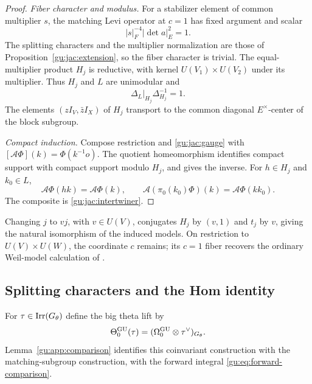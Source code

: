 \begin{proof}
\emph{Fiber character and modulus.}
For a stabilizer element of common multiplier $s$, the matching Levi
operator at $c=1$ has fixed argument and scalar
\begin{equation}\label{gu:jac:trivial-fiber}
 |s|_F^{-4}|\det a|_E^2=1.
\end{equation}
The splitting characters and the multiplier normalization are those of
Proposition~\ref{gu:jac:extension}, so the fiber character is trivial.
The equal-multiplier product $H_j$ is reductive, with kernel
$U(V_1)\times U(V_2)$ under its multiplier. Thus $H_j$ and $L$ are
unimodular and
\begin{equation}\label{gu:jac:relative-modulus}
 \Delta_L|_{H_j}\Delta_{H_j}^{-1}=1.
\end{equation}
The elements
$(zI_V,\bar zI_X)$ of $H_j$ transport to the common diagonal
$E^\times$-center of the block subgroup.

\emph{Compact induction.}
Compose restriction and \eqref{gu:jac:gauge} with
$[\mathcal A\Phi](k)=\Phi(k^{-1}o)$. The quotient homeomorphism
identifies compact support with compact support modulo $H_j$, and gives
the inverse. For $h\in H_j$ and $k_0\in L$,
\[
 \mathcal A\Phi(hk)=\mathcal A\Phi(k),\qquad
 \mathcal A(\pi_0(k_0)\Phi)(k)=\mathcal A\Phi(kk_0).
\]
The composite is \eqref{gu:jac:intertwiner}.
\end{proof}

Changing $j$ to $vj$, with $v\in U(V)$, conjugates $H_j$ by $(v,1)$
and $t_j$ by $v$, giving the natural isomorphism of the induced models.
On restriction to $U(V)\times U(W)$, the coordinate $c$ remains;
its $c=1$ fiber recovers the ordinary Weil-model calculation of
\cite[Proposition~3.4]{ChenGan}.


\subsection{Splitting characters and the Hom identity}\label{gu:sec:hom}
For $\tau\in\operatorname{Irr}(G_\theta)$ define the big theta lift by
\begin{equation}\label{gu:eq:big-theta-zero}
 \Theta_0^{\operatorname{GU}}(\tau)=(\Omega_0^{\operatorname{GU}}\otimes\tau^\vee)_{G_\theta}.
\end{equation}
Lemma~\ref{gu:app:comparison} identifies this coinvariant construction with the matching-subgroup construction, with the forward
integral \eqref{gu:eq:forward-comparison}.

